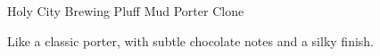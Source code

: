 \begin{recipe}{Holy City Brewing Pluff Mud Porter Clone}

\begin{aboutblock}
Like a classic porter, with subtle chocolate notes and a silky finish.
\sourceaha
\end{aboutblock}


\begin{methodandtiming}
 
\begin{mashsteps}
\end{mashsteps}

\end{methodandtiming}

\recipebreak

\begin{ingredientsblock}

\begin{malts}
\end{malts}

\begin{hops}
\end{hops}


\end{ingredientsblock}

\end{recipe}

